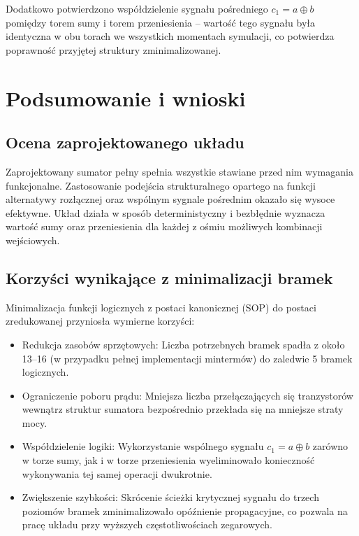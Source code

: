 \documentclass[12pt,a4paper]{article}
\begin{document}
Dodatkowo potwierdzono współdzielenie sygnału pośredniego $c_1 = a \oplus b$ pomiędzy torem sumy i torem przeniesienia -- wartość tego sygnału była identyczna w obu torach we wszystkich momentach symulacji, co potwierdza poprawność przyjętej struktury zminimalizowanej.


\section{Podsumowanie i wnioski}

\subsection{Ocena zaprojektowanego układu}

Zaprojektowany sumator pełny spełnia wszystkie stawiane przed nim wymagania funkcjonalne. Zastosowanie podejścia strukturalnego opartego na funkcji alternatywy rozłącznej oraz wspólnym sygnale pośrednim okazało się wysoce efektywne. Układ działa w sposób deterministyczny i bezbłędnie wyznacza wartość sumy oraz przeniesienia dla każdej z ośmiu możliwych kombinacji wejściowych.

\subsection{Korzyści wynikające z minimalizacji bramek}

Minimalizacja funkcji logicznych z postaci kanonicznej (SOP) do postaci zredukowanej przyniosła wymierne korzyści:

\begin{itemize}
    \item Redukcja zasobów sprzętowych: Liczba potrzebnych bramek spadła z około 13--16 (w przypadku pełnej implementacji mintermów) do zaledwie 5 bramek logicznych.
    \item Ograniczenie poboru prądu: Mniejsza liczba przełączających się tranzystorów wewnątrz struktur sumatora bezpośrednio przekłada się na mniejsze straty mocy.
    \item Współdzielenie logiki: Wykorzystanie wspólnego sygnału $c_1 = a \oplus b$ zarówno w torze sumy, jak i w torze przeniesienia wyeliminowało konieczność wykonywania tej samej operacji dwukrotnie.
    \item Zwiększenie szybkości: Skrócenie ścieżki krytycznej sygnału do trzech poziomów bramek zminimalizowało opóźnienie propagacyjne, co pozwala na pracę układu przy wyższych częstotliwościach zegarowych.
\end{itemize}
\end{document}
